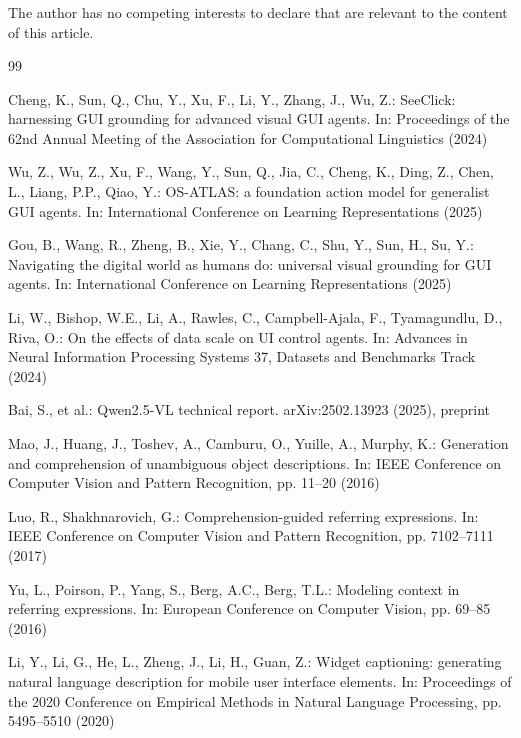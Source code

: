 \documentclass[runningheads,a4paper]{llncs}
\begin{document}
\begin{credits}
\subsubsection{\discintname}
The author has no competing interests to declare that are relevant to the content of this article.
\end{credits}

\begin{thebibliography}{99}

Cheng, K., Sun, Q., Chu, Y., Xu, F., Li, Y., Zhang, J., Wu, Z.: SeeClick: harnessing GUI
grounding for advanced visual GUI agents. In: Proceedings of the 62nd Annual Meeting of the
Association for Computational Linguistics (2024)

Wu, Z., Wu, Z., Xu, F., Wang, Y., Sun, Q., Jia, C., Cheng, K., Ding, Z., Chen, L., Liang, P.P.,
Qiao, Y.: OS-ATLAS: a foundation action model for generalist GUI agents. In: International
Conference on Learning Representations (2025)

Gou, B., Wang, R., Zheng, B., Xie, Y., Chang, C., Shu, Y., Sun, H., Su, Y.: Navigating the
digital world as humans do: universal visual grounding for GUI agents. In: International
Conference on Learning Representations (2025)

Li, W., Bishop, W.E., Li, A., Rawles, C., Campbell-Ajala, F., Tyamagundlu, D., Riva, O.:
On the effects of data scale on UI control agents. In: Advances in Neural Information Processing
Systems 37, Datasets and Benchmarks Track (2024)

Bai, S., et al.: Qwen2.5-VL technical report. arXiv:2502.13923 (2025), preprint

Mao, J., Huang, J., Toshev, A., Camburu, O., Yuille, A., Murphy, K.: Generation and comprehension
of unambiguous object descriptions. In: IEEE Conference on Computer Vision and Pattern
Recognition, pp. 11--20 (2016)

Luo, R., Shakhnarovich, G.: Comprehension-guided referring expressions. In: IEEE Conference on
Computer Vision and Pattern Recognition, pp. 7102--7111 (2017)

Yu, L., Poirson, P., Yang, S., Berg, A.C., Berg, T.L.: Modeling context in referring expressions.
In: European Conference on Computer Vision, pp. 69--85 (2016)

Li, Y., Li, G., He, L., Zheng, J., Li, H., Guan, Z.: Widget captioning: generating natural
language description for mobile user interface elements. In: Proceedings of the 2020 Conference
on Empirical Methods in Natural Language Processing, pp. 5495--5510 (2020)


\end{thebibliography}
\end{document}

